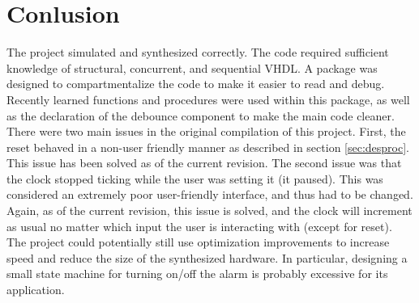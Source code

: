 \documentclass[12pt]{article}
\begin{document}
%
%
%
%

\newpage

\section{Conlusion} \label{cncl}
The project simulated and synthesized correctly.  The code required sufficient knowledge of structural, concurrent, and sequential VHDL. A package was designed to compartmentalize the code to make it easier to read and debug.  Recently learned functions and procedures were used within this package, as well as the declaration of the debounce component to make the main code cleaner.  There were two main issues in the original compilation of this project.  First, the reset behaved in a non-user friendly manner as described in section \ref{sec:desproc}.  This issue has been solved as of the current revision.  The second issue was that the clock stopped ticking while the user was setting it (it paused).  This was considered an extremely poor user-friendly interface, and thus had to be changed.  Again, as of the current revision, this issue is solved, and the clock will increment as usual no matter which input the user is interacting with (except for reset).  The project could potentially still use optimization improvements to increase speed and reduce the size of the synthesized hardware.  In particular, designing a small state machine for turning on/off the alarm is probably excessive for its application.
\end{document}
